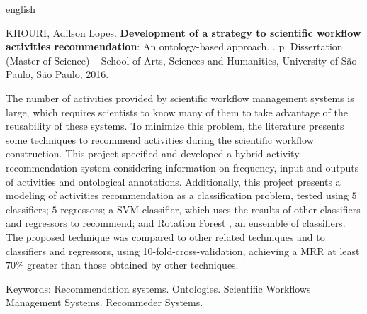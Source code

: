 \documentclass[
	12pt,				%
	oneside,			%
	a4paper,			%
	english,			%
	brazil				%
	]{abntex2ppgsi}
\numberwithin{equation}{section}
\begin{document}
% 
% 
\begin{resumo}[Abstract]
\begin{otherlanguage*}{english}

% 
%
%
%
\begin{flushleft}
KHOURI, Adilson Lopes. \textbf{Development of a strategy to scientific workflow activities recommendation}: An ontology-based approach. \imprimirdata. \pageref{LastPage} p. Dissertation (Master of Science) – School of Arts, Sciences and Humanities, University of São Paulo, São Paulo, 2016. 
\end{flushleft}

The number of activities provided by scientific workflow management systems is large, which requires scientists to know many of them to take advantage of the reusability of these systems. To minimize this problem, the literature presents some techniques to recommend activities during the scientific workflow construction. %
This project specified and developed a hybrid activity recommendation system considering information on frequency, input and outputs of activities and ontological annotations. Additionally, this project presents a modeling of activities recommendation as a classification problem, tested using \(5\) classifiers; \(5\) regressors; a SVM classifier, which uses the results of other classifiers and regressors to recommend; and Rotation Forest , an ensemble of classifiers. The proposed technique was compared to other related techniques and to classifiers and regressors, using 10-fold-cross-validation, achieving a MRR at least \(70\% \) greater than those obtained by other techniques.

Keywords: Recommendation systems. Ontologies. Scientific Workflows Management Systems. Recommeder Systems.

\end{otherlanguage*}
\end{resumo}
\end{document}
